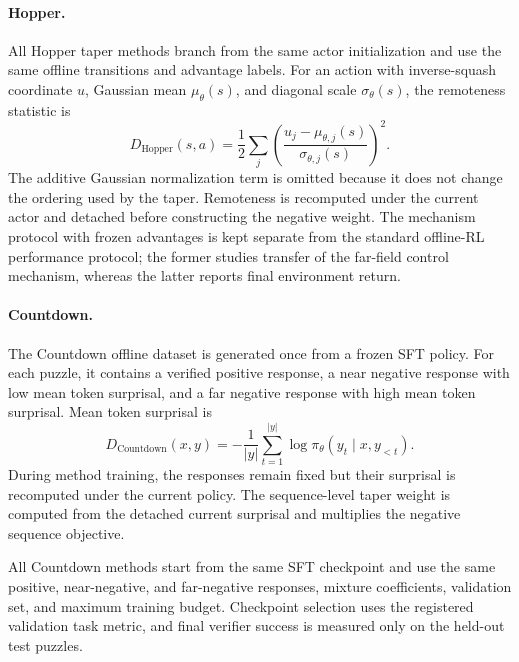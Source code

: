 \paragraph{Hopper.}
All Hopper taper methods branch from the same actor initialization and
use the same offline transitions and advantage labels. For an action
with inverse-squash coordinate $u$, Gaussian mean $\mu_\theta(s)$, and
diagonal scale $\sigma_\theta(s)$, the remoteness statistic is
\begin{equation}
    D_{\mathrm{Hopper}}(s,a)
    =
    \frac{1}{2}
    \sum_j
    \left(
        \frac{
            u_j-\mu_{\theta,j}(s)
        }{
            \sigma_{\theta,j}(s)
        }
    \right)^2.
    \label{eq:hopper_taper_remoteness}
\end{equation}
The additive Gaussian normalization term is omitted because it does not
change the ordering used by the taper. Remoteness is recomputed under
the current actor and detached before constructing the negative weight.
The mechanism protocol with frozen advantages is kept separate from the
standard offline-RL performance protocol; the former studies transfer of
the far-field control mechanism, whereas the latter reports final
environment return.

\paragraph{Countdown.}
The Countdown offline dataset is generated once from a frozen SFT
policy. For each puzzle, it contains a verified positive response, a
near negative response with low mean token surprisal, and a far negative
response with high mean token surprisal. Mean token surprisal is
\begin{equation}
    D_{\mathrm{Countdown}}(x,y)
    =
    -\frac{1}{|y|}
    \sum_{t=1}^{|y|}
    \log
    \pi_\theta
    \left(
        y_t
        \mid
        x,y_{<t}
    \right).
    \label{eq:countdown_taper_remoteness}
\end{equation}
During method training, the responses remain fixed but their surprisal is
recomputed under the current policy. The sequence-level taper weight is
computed from the detached current surprisal and multiplies the negative
sequence objective.

All Countdown methods start from the same SFT checkpoint and use the
same positive, near-negative, and far-negative responses, mixture
coefficients, validation set, and maximum training budget. Checkpoint
selection uses the registered validation task metric, and final verifier
success is measured only on the held-out test puzzles.


